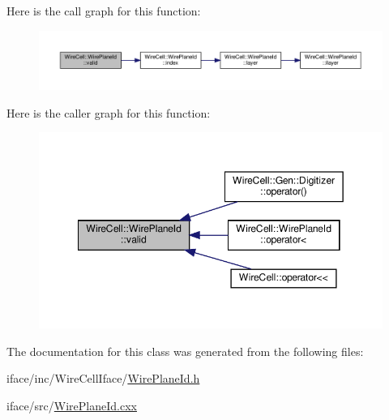 Here is the call graph for this function\+:
\nopagebreak
\begin{figure}[H]
\begin{center}
\leavevmode
\includegraphics[width=350pt]{class_wire_cell_1_1_wire_plane_id_a617a3b37d14485b685db0762be14bec4_cgraph}
\end{center}
\end{figure}
Here is the caller graph for this function\+:
\nopagebreak
\begin{figure}[H]
\begin{center}
\leavevmode
\includegraphics[width=349pt]{class_wire_cell_1_1_wire_plane_id_a617a3b37d14485b685db0762be14bec4_icgraph}
\end{center}
\end{figure}


The documentation for this class was generated from the following files\+:\begin{DoxyCompactItemize}
\item 
iface/inc/\+Wire\+Cell\+Iface/\hyperlink{_wire_plane_id_8h}{Wire\+Plane\+Id.\+h}\item 
iface/src/\hyperlink{_wire_plane_id_8cxx}{Wire\+Plane\+Id.\+cxx}\end{DoxyCompactItemize}
